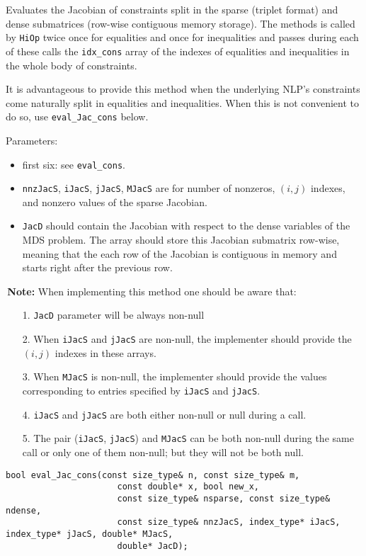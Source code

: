 \documentclass[11pt]{article}
\newcommand{\warningSymbol}{\raisebox{0.9\depth}{\danger}}
\newcommand{\warningcp}[1]{%
        \smallskip \noindent \textcolor{warningColorText}{\warningSymbol{}}\,\textbf{#1} %
    }
\newcommand{\Hi}{\texttt{HiOp}\xspace}
\begin{document}
Evaluates the Jacobian of constraints split in the sparse (triplet format) and dense submatrices (row-wise contiguous memory storage). The methods is called by \Hi twice once for equalities and once for inequalities and passes during each of these calls  the \texttt{idx\_cons} array of the indexes of equalities and inequalities in the whole body of constraints.

It is advantageous to provide
this method when the underlying NLP's constraints come naturally split in equalities
and inequalities. When this is not convenient to do so, use \texttt{eval\_Jac\_cons} below.

Parameters:
\begin{itemize} 
\item first six: see \texttt{eval\_cons}.
\item \texttt{nnzJacS}, \texttt{iJacS}, \texttt{jJacS}, \texttt{MJacS} are for number of nonzeros, $(i,j)$ indexes, and nonzero values of   the sparse Jacobian.
\item \texttt{JacD} should contain the Jacobian with respect to the dense variables of the MDS problem. The array should store this Jacobian submatrix row-wise, meaning that the each row of the Jacobian is contiguous in memory and starts right after the previous row.
\end{itemize}

\warningcp{Note:} When implementing this method one should be aware that:
\begin{itemize}
\item[1.] \texttt{JacD} parameter will be always non-null
\item[2.] When \texttt{iJacS} and \texttt{jJacS} are non-null, the implementer should provide the $(i,j)$   indexes in these arrays. 
\item[3.] When \texttt{MJacS} is non-null, the implementer should provide the values corresponding to    entries specified by \texttt{iJacS} and \texttt{jJacS}.
\item[4.] \texttt{iJacS} and \texttt{jJacS} are both either non-null or null during a call.
\item[5.] The pair (\texttt{iJacS}, \texttt{jJacS}) and \texttt{MJacS} can be both non-null during the same call or only one of them  non-null; but they will not be both null.
\end{itemize}


\begin{lstlisting}
bool eval_Jac_cons(const size_type& n, const size_type& m, 
			          const double* x, bool new_x,
			          const size_type& nsparse, const size_type& ndense, 
			          const size_type& nnzJacS, index_type* iJacS, index_type* jJacS, double* MJacS, 
			          double* JacD);
\end{lstlisting} 
\end{document}
